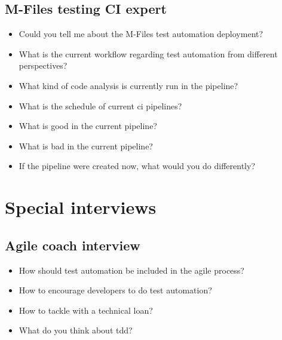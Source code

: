 \subsection*{M-Files testing CI expert}
\begin{itemize}[noitemsep]
	\item Could you tell me about the M-Files test automation deployment?
	\item What is the current workflow regarding test automation from different perspectives?
	\item What kind of code analysis is currently run in the pipeline?
	\item What is the schedule of current \gls{ci} pipelines?
	\item What is good in the current pipeline?
	\item What is bad in the current pipeline?
	\item If the pipeline were created now, what would you do differently?
\end{itemize}

\section{Special interviews}

\subsection*{Agile coach interview}
\begin{itemize}[noitemsep]
	\item How should test automation be included in the agile process?
	\item How to encourage developers to do test automation?
	\item How to tackle with a technical loan?
	\item What do you think about \gls{tdd}?
\end{itemize}